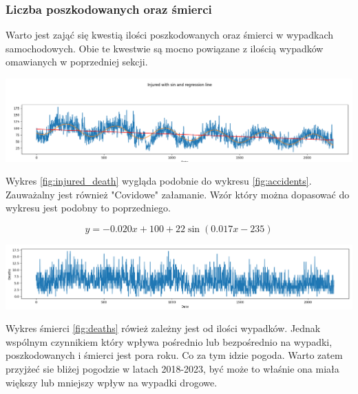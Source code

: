 \documentclass{article}
\begin{document}
\subsubsection{Liczba poszkodowanych oraz śmierci}

Warto jest zająć się kwestią ilości poszkodowanych oraz śmierci w wypadkach samochodowych. Obie te kwestwie są mocno powiązane z ilością wypadków omawianych w poprzedniej sekcji. 

\begin{center}
    \includegraphics[scale=0.3]{visualization/injured_sin.png}
    \captionsetup{hypcap=false}
    \label{fig:injured_death}
\end{center}

Wykres \ref{fig:injured_death} wygląda podobnie do wykresu \ref{fig:accidents}. Zauważalny jest również "Covidowe" załamanie. Wzór który można dopasować do wykresu jest podobny to poprzedniego.

\begin{equation} \label{eq:sin_equation2}
    y = -0.020x + 100 + 22\sin(0.017x - 235) 
\end{equation}


 \begin{center}
    \includegraphics[scale=0.4]{visualization/deaths.png}
    \captionsetup{hypcap=false}
    \label{fig:deaths}
\end{center}

Wykres śmierci \ref{fig:deaths} rówież zależny jest od ilości wypadków. Jednak wspólnym czynnikiem który wpływa pośrednio lub bezpośrednio na wypadki, poszkodowanych i śmierci jest pora roku. Co za tym idzie pogoda. Warto zatem przyjżeć sie bliżej pogodzie w latach 2018-2023, być może to właśnie ona miała większy lub mniejszy wpływ na wypadki drogowe. 
\end{document}
